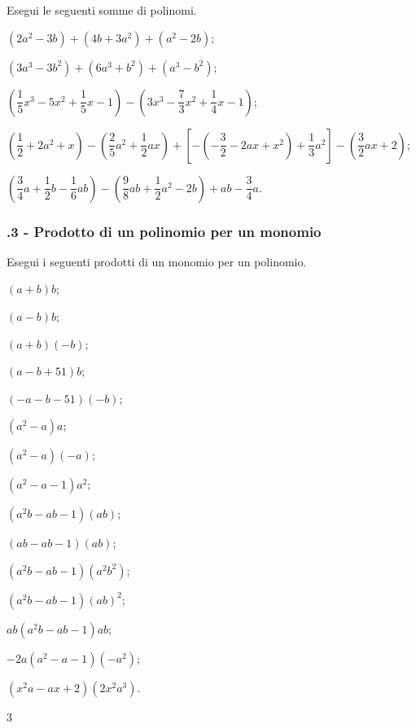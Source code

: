 \begin{esercizio}[\Ast]
\label{ese:10.14}
 Esegui le seguenti somme di polinomi.

 \begin{enumeratea}
 \item $\left(2a^{2}-3b\right)+\left(4b+3a^{2}\right)+\left(a^{2}-2b\right)$;
 \item $\left(3a^{3}-3b^{2}\right)+\left(6a^{3}+b^{2}\right)+\left(a^{3}-b^{2}\right)$;
 \item $\left(\dfrac{1}{5}x^{3}-5x^{2}+\dfrac{1}{5}x-1\right)-\left(3x^{3}-\dfrac{7}{3}x^{2}+\dfrac{1}{4}x-1\right)$;
 \item $\left(\dfrac{1}{2}+2a^{2}+x\right)-\left(\dfrac{2}{5}a^{2}+\dfrac{1}{2}{ax}\right)+\left[-\left(-{\dfrac{3}{2}}-2{ax}+x^{2}\right)+\dfrac{1}{3}a^{2}\right]-\left(\dfrac{3}{2}{ax}+2\right)$;
 \item $\left(\dfrac{3}{4}a+\dfrac{1}{2}b-\dfrac{1}{6}{ab}\right)-\left(\dfrac{9}{8}{ab}+\dfrac{1}{2}a^{2}-2b\right)+{ab}-\dfrac{3}{4}a$.
\end{enumeratea}
\end{esercizio}

\subsubsection*{\thechapter.3 - Prodotto di un polinomio per un monomio}

\begin{esercizio}
\label{ese:10.15}
 Esegui i seguenti prodotti di un monomio per un polinomio.
 \begin{multicols}{3}
\begin{enumeratea}
 \item $(a + b)b$;
 \item $(a - b)b$;
 \item $(a +b)(-b)$;
 \item $(a - b + 51)b$;
 \item $(-a - b -51)(-b)$;
 \item $(a^{2} - a)a$;
 \item $(a^{2} - a)(-a)$;
 \item $(a^{2}- a - 1)a^{2}$;
 \item $(a^{2}b-ab - 1)(ab)$;
 \item $(ab- ab - 1)(ab)$;
 \item $(a^{2}b- ab -1)(a^{2}b^{2})$;
 \item $(a^{2}b-ab - 1)(ab)^{2}$;
 \item $ab(a^{2}b- ab -1)ab$;
 \item $-2a(a^{2} - a - 1)(-a^{2})$;
 \item $(x^{2}a- ax+2)(2x^{2}a^{3})$.
\end{enumeratea}
\end{multicols}
\end{esercizio}3

